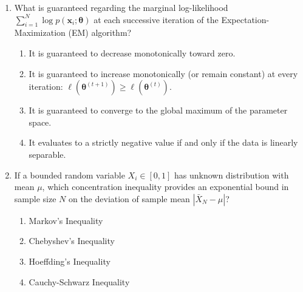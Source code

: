 \begin{enumerate}[label=\textbf{MCQ\arabic*.}]
    \item What is guaranteed regarding the marginal log-likelihood $\sum_{i=1}^N \log p(\mathbf{x}_i; \boldsymbol{\theta})$ at each successive iteration of the Expectation-Maximization (EM) algorithm?
    \begin{enumerate}[label=(\alph*)]
        \item It is guaranteed to decrease monotonically toward zero.
        \item It is guaranteed to increase monotonically (or remain constant) at every iteration: $\ell(\boldsymbol{\theta}^{(t+1)}) \ge \ell(\boldsymbol{\theta}^{(t)})$.
        \item It is guaranteed to converge to the global maximum of the parameter space.
        \item It evaluates to a strictly negative value if and only if the data is linearly separable.
    \end{enumerate}

    \item If a bounded random variable $X_i \in [0, 1]$ has unknown distribution with mean $\mu$, which concentration inequality provides an exponential bound in sample size $N$ on the deviation of sample mean $|\bar{X}_N - \mu|$?
    \begin{enumerate}[label=(\alph*)]
        \item Markov's Inequality
        \item Chebyshev's Inequality
        \item Hoeffding's Inequality
        \item Cauchy-Schwarz Inequality
    \end{enumerate}
\end{enumerate}
